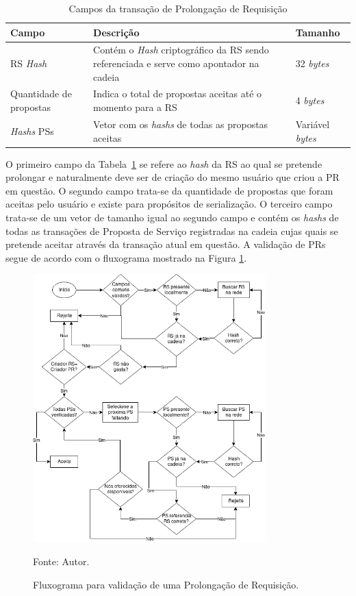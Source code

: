 \begin{table}[ht]
\centering
    \begin{tabular}{|m{}|m{}|m{}|}
    \hline
         \textbf{Campo} & \textbf{Descrição} & \textbf{Tamanho}  \\
         \hline
         \ac{RS} \textit{Hash} & Contém o \textit{Hash} criptográfico da \ac{RS} sendo referenciada e serve como apontador na cadeia & 32 \textit{bytes} \\
         \hline
         Quantidade de propostas & Indica o total de propostas aceitas até o momento para a \ac{RS} & 4 \textit{bytes} \\
         \hline
         \textit{Hashs} \acp{PS} & Vetor com os \textit{hashs} de todas as propostas aceitas & Variável \textit{bytes} \\
    \hline
    \end{tabular}
    \caption{Campos da transação de Prolongação de Requisição}
    \label{tabela:pr}
\end{table}

O primeiro campo da Tabela~\ref{tabela:pr} se refere ao \textit{hash} da \ac{RS} ao qual se pretende prolongar e naturalmente deve ser de criação do mesmo usuário que criou a \ac{PR} em questão. O segundo campo trata-se da quantidade de propostas que foram aceitas pelo usuário e existe para propósitos de serialização. O terceiro campo trata-se de um vetor de tamanho igual ao segundo campo e contém os \textit{hashs} de todas as transações de Proposta de Serviço registradas na cadeia cujas quais se pretende aceitar através da transação atual em questão. A validação de \acp{PR} segue de acordo com o fluxograma mostrado na Figura \ref{fig:validacao_pr}.

\begin{figure}[ht!]
\caption{Fluxograma para validação de uma Prolongação de Requisição.}
\centering
\includegraphics[width=0.8\textwidth]{imagens/validacao_pr.png}
\begin{center}
        Fonte: Autor.
\end{center}
\label{fig:validacao_pr}
\end{figure}

